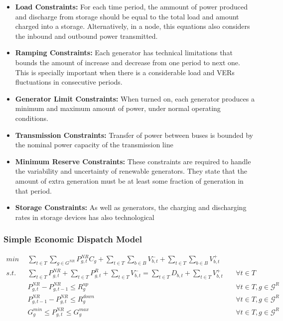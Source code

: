 \documentclass[12pt,LUDisStyle,twosided]{book}
\newcommand{\mc}{\mathcal}
\begin{document}
\begin{itemize}
\item \textbf{Load Constraints:} For each time period, the ammount of power produced and discharge from storage should be equal to the total load and amount charged into a storage. Alternatively, in a node, this equations also considers the inbound and outbound power transmitted.
\item \textbf{Ramping Constraints:}  Each generator has technical limitations that bounds the amount of increase and decrease from one period to next one. This is specially important when there is a considerable load and VERs fluctuations in consecutive periods.
\item \textbf{Generator Limit Constraints:} When turned on, each generator produces a minimum and maximum amount of power, under normal operating conditions.
\item \textbf{Transmission Constraints:} Transfer of power between buses is bounded by the nominal power capacity of the transmission line
\item \textbf{Minimum Reserve Constraints:} These constraints are required to handle the variability and uncertainty of renewable generators. They state that the amount of extra generation must be at least some fraction of generation in that period.
\item \textbf{Storage Constraints:} As well as generators, the charging and discharging rates in storage devices has also technological 


\end{itemize}

\subsubsection{Simple Economic Dispatch Model}

\begin{subequations}\label{model:simple_ED}
\begin{alignat}{4}
min ~~& \sum_{t \in T}\sum_{g \in G^{NR}} P^{NR}_{g,t} C_{g} + \sum_{t \in T}\sum_{b \in B} V^{-}_{b,t} + \sum_{t \in T}\sum_{b \in B} V^{+}_{b,t} \label{eq:ObjectiveFunction} \\
s.t. ~~~& \sum_{t \in T} P^{NR}_{g,t} + \sum_{t \in T} P^{R}_{g,t} + \sum_{t \in T}V^{-}_{b,t} = \sum_{t \in T} D_{b,t}  + \sum_{t \in T}V^{+}_{b,t}  &~& \forall t \in T  \label{eq:loadBalanceConstraint} \\
& P^{NR}_{g,t} - P^{NR}_{g,t - 1} \leq R^{up}_{g} &~& \forall t \in T, g \in \mc{G}^{R}\label{eq:rampUpRateConstraint} \\
& P^{NR}_{g,t -1 } - P^{NR}_{g,t} \leq R^{down}_{g} &~& \forall t \in T, g \in \mc{G}^{R}\label{eq:rampDownRateConstraint} \\
& G^{min}_{g}\leq P^{NR}_{g,t} \leq G^{max}_{g} &~& \forall t \in T, g \in \mc{G}^{R}\label{eq:generationBounds}
\end{alignat} 
\end{subequations}
\end{document}
